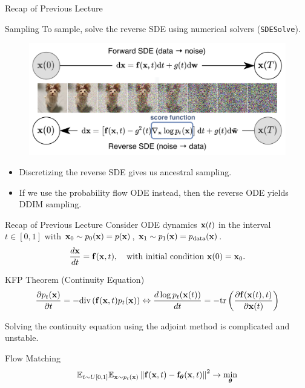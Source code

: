 \documentclass{beamer}
\begin{document}
\begin{frame}{Recap of Previous Lecture}
	\begin{block}{Sampling}
		To sample, solve the reverse SDE using numerical solvers (\texttt{SDESolve}).
		\begin{figure}
			\includegraphics[width=0.8\linewidth]{figs/sbgm}
		\end{figure}
		\vspace{-0.5cm}
	\end{block}
	\begin{itemize}
		\item Discretizing the reverse SDE gives us ancestral sampling.
		\item If we use the probability flow ODE instead, then the reverse ODE yields DDIM sampling.
	\end{itemize}
\end{frame}
\begin{frame}{Recap of Previous Lecture}
	Consider ODE dynamics $\mathbf{x}(t)$ in the interval $t \in [0, 1]$ with $\mathbf{x}_0 \sim p_0(\mathbf{x}) = p(\mathbf{x})$, $\mathbf{x}_1 \sim p_1(\mathbf{x}) =  p_{\text{data}}(\mathbf{x})$.
	\[
		\frac{d \mathbf{x}}{dt} = \mathbf{f} (\mathbf{x}, t),  \quad \text{with initial condition $\mathbf{x}(0) = \mathbf{x}_0$}.
	\]
	\vspace{-0.5cm}
	\begin{block}{KFP Theorem (Continuity Equation)}
		\vspace{-0.5cm}
		\[
			\frac{\partial p_t(\mathbf{x})}{\partial t} = - \text{div}\left(\mathbf{f}(\mathbf{x}, t) p_t(\mathbf{x})\right) \Leftrightarrow \frac{d \log p_t(\mathbf{x}(t))}{d t} = - \text{tr} \left( \frac{\partial \mathbf{f}(\mathbf{x}(t), t)}{\partial \mathbf{x}(t)} \right)
		\]
		\vspace{-0.3cm}
	\end{block}
	Solving the continuity equation using the adjoint method is complicated and unstable.
	\begin{block}{Flow Matching}
		\vspace{-0.3cm}
		\[
			\mathbb{E}_{t \sim U[0, 1]} \mathbb{E}_{\mathbf{x} \sim p_t(\mathbf{x})}\left\| \mathbf{f}(\mathbf{x}, t) - \mathbf{f}_{\boldsymbol{\theta}}(\mathbf{x}, t) \right\|^2 \rightarrow \min_{\boldsymbol{\theta}}
		\]
		\vspace{-0.3cm}
	\end{block}
\end{frame}
\end{document}
